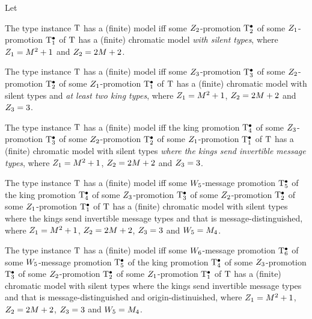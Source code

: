 \begin{definition}
Let 
\end{definition}


\begin{remark}
The type instance $\mathrm{T}$ has a (finite) model
iff some $Z_{2}$-promotion $\mathrm{T}_{2}^{\bullet}$
of some $Z_{1}$-promotion $\mathrm{T}_{1}^{\bullet}$ of $\mathrm{T}$
has a (finite) chromatic model
\emph{with silent types},
where $Z_{1} = M^2+1$ and $Z_{2} = 2M+2$.
\end{remark}

\begin{remark}
The type instance $\mathrm{T}$ has a (finite) model
iff some $Z_{3}$-promotion $\mathrm{T}_{3}^{\bullet}$
of some $Z_{2}$-promotion $\mathrm{T}_{2}^{\bullet}$
of some $Z_{1}$-promotion $\mathrm{T}_{1}^{\bullet}$ of $\mathrm{T}$
has a (finite) chromatic model with silent types and
\emph{at least two king types},
where $Z_{1} = M^2+1$, $Z_{2} = 2M+2$ and $Z_{3} = 3$.
\end{remark}

\begin{remark}
The type instance $\mathrm{T}$ has a (finite) model
iff the king promotion $\mathrm{T}_{4}^{\bullet}$
of some $Z_{3}$-promotion $\mathrm{T}_{3}^{\bullet}$
of some $Z_{2}$-promotion $\mathrm{T}_{2}^{\bullet}$
of some $Z_{1}$-promotion $\mathrm{T}_{1}^{\bullet}$ of $\mathrm{T}$
has a (finite) chromatic model with silent types
\emph{where the kings send invertible message types},
where $Z_{1} = M^2+1$, $Z_{2} = 2M+2$ and $Z_{3} = 3$.
\end{remark}

\begin{remark}
The type instance $\mathrm{T}$ has a (finite) model
iff some $W_{5}$-message promotion $\mathrm{T}_{5}^{\bullet}$
of the king promotion $\mathrm{T}_{4}^{\bullet}$
of some $Z_{3}$-promotion $\mathrm{T}_{3}^{\bullet}$
of some $Z_{2}$-promotion $\mathrm{T}_{2}^{\bullet}$
of some $Z_{1}$-promotion $\mathrm{T}_{1}^{\bullet}$ of $\mathrm{T}$
has a (finite) chromatic model with silent types
where the kings send invertible message types and
that is message-distinguished,
where $Z_{1} = M^2+1$, $Z_{2} = 2M+2$, $Z_{3} = 3$
and $W_{5} = M_{4}$.
\end{remark}

\begin{remark}
The type instance $\mathrm{T}$ has a (finite) model
iff some $W_{6}$-message promotion $\mathrm{T}_{6}^{\bullet}$
of some $W_{5}$-message promotion $\mathrm{T}_{5}^{\bullet}$
of the king promotion $\mathrm{T}_{4}^{\bullet}$
of some $Z_{3}$-promotion $\mathrm{T}_{3}^{\bullet}$
of some $Z_{2}$-promotion $\mathrm{T}_{2}^{\bullet}$
of some $Z_{1}$-promotion $\mathrm{T}_{1}^{\bullet}$ of $\mathrm{T}$
has a (finite) chromatic model with silent types
where the kings send invertible message types and
that is message-distinguished
and origin-distinuished,
where $Z_{1} = M^2+1$, $Z_{2} = 2M+2$, $Z_{3} = 3$
and $W_{5} = M_{4}$.
\end{remark}



